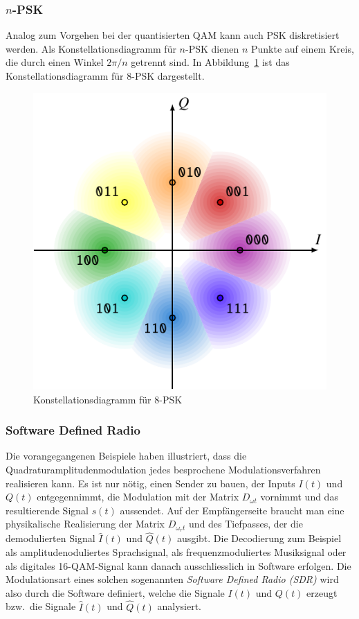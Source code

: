 \subsubsection{$n$-PSK}
Analog zum Vorgehen bei der quantisierten QAM kann auch PSK diskretisiert
werden.
Als Konstellationsdiagramm für $n$-PSK dienen $n$ Punkte auf einem Kreis,
die durch einen Winkel $2\pi/n$ getrennt sind.
In Abbildung~\ref{figure:qam:psk} ist das Konstellationsdiagramm für
$8$-PSK dargestellt.
\begin{figure}
\centering
\includegraphics{applications/qam/psk.pdf}
\caption{Konstellationsdiagramm für 8-PSK 
\label{figure:qam:psk}}
\end{figure}

\subsubsection{Software Defined Radio}
Die vorangegangenen Beispiele haben illustriert, dass die
Quadraturamplitudenmodulation jedes besprochene Modulationsverfahren
realisieren kann.
Es ist nur nötig, einen Sender zu bauen, der Inputs $I(t)$ und $Q(t)$
entgegennimmt, die Modulation mit der Matrix $D_{\omega t}$ vornimmt
und das resultierende Signal $s(t)$ aussendet.
Auf der Empfängerseite braucht man eine physikalische Realisierung
der Matrix $D_{\omega_r t}$ und des Tiefpasses, der die demodulierten
Signal $\hat{I}(t)$ und $\hat{Q}(t)$ ausgibt.
Die Decodierung zum Beispiel als amplitudenoduliertes Sprachsignal,
als frequenzmoduliertes Musiksignal oder als digitales 16-QAM-Signal
kann danach ausschliesslich in Software erfolgen.
Die Modulationsart eines solchen sogenannten {\em Software Defined Radio (SDR)}
wird also durch die Software definiert, welche die Signale $I(t)$ und $Q(t)$
erzeugt bzw.~die Signale $\hat{I}(t)$ und $\hat{Q}(t)$ analysiert.




